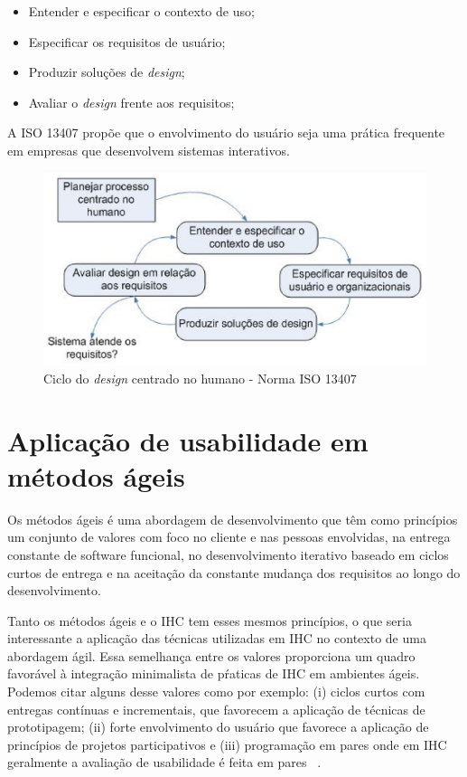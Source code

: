\begin{itemize}
\item Entender e especificar o contexto de uso;
\item Especificar os requisitos de usuário;
\item Produzir soluções de \emph{design};
\item Avaliar o \emph{design} frente aos requisitos;
\end{itemize}

A ISO 13407 propõe que o envolvimento do usuário seja uma prática frequente em empresas que desenvolvem sistemas interativos.

\begin{figure}[h]
    \centering
    \includegraphics[keepaspectratio=true,scale=0.60]
      {figuras/ciclo_iso13407.eps}
    \caption{Ciclo do \emph{design} centrado no humano - Norma ISO 13407}
    \label{ciclo_iso13407}
\end{figure}




\section{Aplicação de usabilidade em métodos ágeis}
	
	Os métodos ágeis é uma abordagem de desenvolvimento que têm como princípios um conjunto de valores com foco no cliente e nas pessoas envolvidas, na entrega constante de software funcional, no desenvolvimento iterativo baseado em ciclos curtos de entrega e na aceitação da constante mudança dos requisitos ao longo do desenvolvimento. 

	Tanto os métodos ágeis e o IHC tem esses mesmos princípios, o que seria interessante a aplicação das técnicas utilizadas em IHC no contexto de uma abordagem ágil. Essa semelhança entre os valores proporciona um quadro favorável à integração minimalista de pŕaticas de IHC em ambientes ágeis. Podemos citar alguns desse valores como por exemplo: (i) ciclos curtos com entregas contínuas e incrementais, que favorecem a aplicação de técnicas de prototipagem; (ii) forte envolvimento do usuário que favorece a aplicação de princípios de projetos participativos e (iii) programação em pares onde em IHC geralmente a avaliação de usabilidade é feita em pares ~\cite{barbosa2008estrategia}. 

